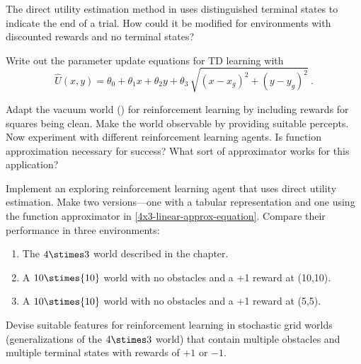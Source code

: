 \begin{iexercise}
The direct utility estimation method in
 uses distinguished terminal states to
indicate the end of a trial. How could it be modified for
environments with discounted rewards and no terminal states?
\end{iexercise} 

\begin{exercise}
Write out the parameter update equations for TD learning with
\[
  \hat{U}(x,y) = \theta_0 + \theta_1 x + \theta_2 y + \theta_3\,\sqrt{(x-x_g)^2 + (y-y_g)^2}\ .
\]
\end{exercise} 



\begin{iexercise}\prgex
Adapt the vacuum world () for
reinforcement learning by including rewards for squares being clean.
Make the world observable by providing suitable percepts. Now experiment with
different reinforcement learning agents. Is function approximation
necessary for success? What sort of approximator works for this application?
\end{iexercise} 

\begin{exercise}%
\prgex Implement an exploring reinforcement learning agent that uses direct utility estimation.
Make two versions---one with a tabular representation and one using the function approximator in \eqref{4x3-linear-approx-equation}.
Compare their performance in three environments:
\begin{enumerate}
\item The \(4\stimes 3\) world described in the chapter.
\item A \({10}\stimes {10}\) world with no obstacles and a +1 reward at (10,10).
\item A \({10}\stimes {10}\) world with no obstacles and a +1 reward at (5,5).
\end{enumerate}
\end{exercise} 

\begin{uexercise}
Devise suitable features for reinforcement learning in stochastic grid worlds (generalizations of the \(4\stimes 3\) world)
that contain multiple obstacles and multiple terminal states with rewards of \(+1\) or \(-1\).
\end{uexercise} 

